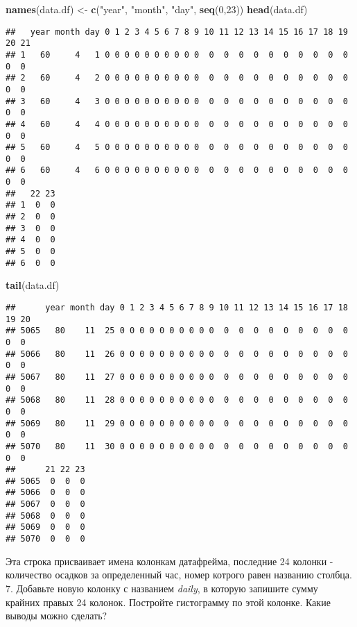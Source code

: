 \documentclass[]{article}
\newenvironment{Shaded}{\begin{snugshade}}{\end{snugshade}}
\newcommand{\KeywordTok}[1]{\textcolor[rgb]{0.13,0.29,0.53}{\textbf{#1}}}
\newcommand{\DecValTok}[1]{\textcolor[rgb]{0.00,0.00,0.81}{#1}}
\newcommand{\StringTok}[1]{\textcolor[rgb]{0.31,0.60,0.02}{#1}}
\newcommand{\NormalTok}[1]{#1}
\begin{document}
\begin{Shaded}
\begin{Highlighting}[]
\KeywordTok{names}\NormalTok{(data.df) <-}\StringTok{ }\KeywordTok{c}\NormalTok{(}\StringTok{"year"}\NormalTok{, }\StringTok{"month"}\NormalTok{, }\StringTok{"day"}\NormalTok{, }\KeywordTok{seq}\NormalTok{(}\DecValTok{0}\NormalTok{,}\DecValTok{23}\NormalTok{))}
\KeywordTok{head}\NormalTok{(data.df)}
\end{Highlighting}
\end{Shaded}

\begin{verbatim}
##   year month day 0 1 2 3 4 5 6 7 8 9 10 11 12 13 14 15 16 17 18 19 20 21
## 1   60     4   1 0 0 0 0 0 0 0 0 0 0  0  0  0  0  0  0  0  0  0  0  0  0
## 2   60     4   2 0 0 0 0 0 0 0 0 0 0  0  0  0  0  0  0  0  0  0  0  0  0
## 3   60     4   3 0 0 0 0 0 0 0 0 0 0  0  0  0  0  0  0  0  0  0  0  0  0
## 4   60     4   4 0 0 0 0 0 0 0 0 0 0  0  0  0  0  0  0  0  0  0  0  0  0
## 5   60     4   5 0 0 0 0 0 0 0 0 0 0  0  0  0  0  0  0  0  0  0  0  0  0
## 6   60     4   6 0 0 0 0 0 0 0 0 0 0  0  0  0  0  0  0  0  0  0  0  0  0
##   22 23
## 1  0  0
## 2  0  0
## 3  0  0
## 4  0  0
## 5  0  0
## 6  0  0
\end{verbatim}

\begin{Shaded}
\begin{Highlighting}[]
\KeywordTok{tail}\NormalTok{(data.df)}
\end{Highlighting}
\end{Shaded}

\begin{verbatim}
##      year month day 0 1 2 3 4 5 6 7 8 9 10 11 12 13 14 15 16 17 18 19 20
## 5065   80    11  25 0 0 0 0 0 0 0 0 0 0  0  0  0  0  0  0  0  0  0  0  0
## 5066   80    11  26 0 0 0 0 0 0 0 0 0 0  0  0  0  0  0  0  0  0  0  0  0
## 5067   80    11  27 0 0 0 0 0 0 0 0 0 0  0  0  0  0  0  0  0  0  0  0  0
## 5068   80    11  28 0 0 0 0 0 0 0 0 0 0  0  0  0  0  0  0  0  0  0  0  0
## 5069   80    11  29 0 0 0 0 0 0 0 0 0 0  0  0  0  0  0  0  0  0  0  0  0
## 5070   80    11  30 0 0 0 0 0 0 0 0 0 0  0  0  0  0  0  0  0  0  0  0  0
##      21 22 23
## 5065  0  0  0
## 5066  0  0  0
## 5067  0  0  0
## 5068  0  0  0
## 5069  0  0  0
## 5070  0  0  0
\end{verbatim}

Эта строка присваивает имена колонкам датафрейма, последние 24 колонки -
количество осадков за определенный час, номер котрого равен названию
столбца. 7. Добавьте новую колонку с названием \emph{daily}, в которую
запишите сумму крайних правых 24 колонок. Постройте гистограмму по этой
колонке. Какие выводы можно сделать?
\end{document}
